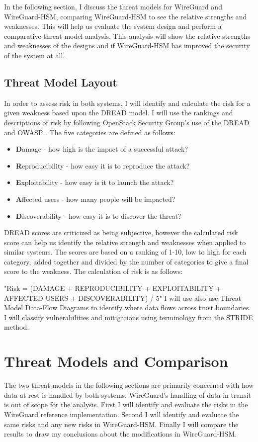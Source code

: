 \documentclass [11pt, proquest] {uwthesis}[2020/02/24]
\begin{document}
In the following section, I discuss the threat models for WireGuard and WireGuard-HSM, comparing WireGuard-HSM to see the relative strengths and weaknesses. This will help us evaluate the system design and perform a comparative threat model analysis. This analysis will show the relative strengths and weaknesses of the designs and if WireGuard-HSM has improved the security of the system at all.

\section{Threat Model Layout}
In order to assess risk in both systems, I will identify and calculate the risk for a given weakness based upon the DREAD model. I will use the rankings and descriptions of risk by following OpenStack Security Group's use of the DREAD and OWASP \cite{noauthor_securityossa-metrics_2022}\cite{noauthor_threat_2022}. The five categories are defined as follows:

\begin{itemize}
  \item \textbf{D}amage - how high is the impact of a successful attack?
  \item \textbf{R}eproducibility - how easy it is to reproduce the attack? 
  \item \textbf{E}xploitability - how easy is it to launch the attack?
  \item \textbf{A}ffected users - how many people will be impacted?
  \item \textbf{D}iscoverability - how easy it is to discover the threat?
\end{itemize}

\label{dread}
DREAD scores are criticized as being subjective, however the calculated risk score can help us identify the relative strength and weaknesses when applied to similar systems. The scores are based on a ranking of 1-10, low to high for each category, added together and divided by the number of categories to give a final score to the weakness. The calculation of risk is as follows:

"Risk = (DAMAGE + REPRODUCIBILITY + EXPLOITABILITY + AFFECTED USERS + DISCOVERABILITY) / 5"
I will use also use Threat Model Data-Flow Diagrams to identify where data flows across trust boundaries.
I will classify vulnerabilities and mitigations using terminology from the STRIDE method\cite{hernan_uncover_2019}.

\chapter {Threat Models and Comparison}
The two threat models in the following sections are primarily concerned with how data at rest is handled by both systems. WireGuard's handling of data in transit is out of scope for the analysis.
First I will identify and evaluate the risks in the WireGuard reference implementation. Second I will identify and evaluate the same risks and any new risks in WireGuard-HSM. Finally I will compare the results to draw my conclusions about the modifications in WireGuard-HSM.
\end{document}
